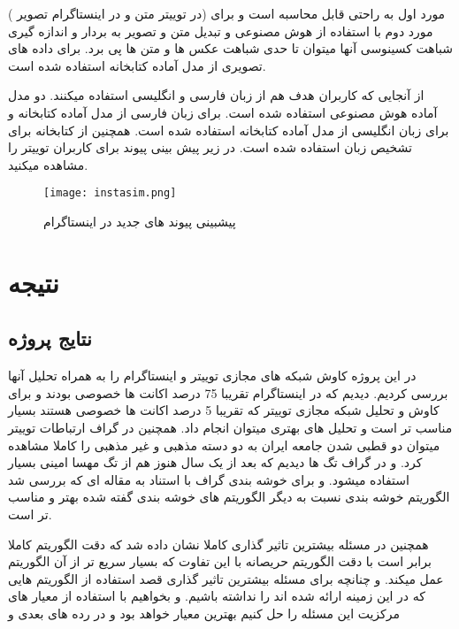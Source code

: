 \documentclass[12pt]{article}
\begin{document}
( در توييتر متن و در اينستاگرام تصوير)
مورد اول به راحتی قابل محاسبه است و برای مورد دوم با استفاده از هوش مصنوعی و تبديل متن و 
تصوير به بردار و اندازه گيری شباهت کسينوسی آنها ميتوان تا حدی شباهت عکس ها و متن ها پی برد.
برای داده های تصویری از مدل آماده کتابخانه 
استفاده شده است.
\cite{ibed}

از آنجایی که کاربران هدف هم از زبان فارسی و انگلیسی استفاده میکنند.
دو مدل آماده هوش مصنوعی استفاده شده است.
برای زبان فارسی از مدل آماده  کتابخانه 
\cite{hazm}
و برای زبان انگلیسی از مدل آماده کتابخانه 
\cite{sentvec}
استفاده شده است.
همچنین از کتابخانه
\cite{detect}
برای تشخیص زبان استفاده شده است.
در زير پيش بينی پيوند برای کاربران توييتر را مشاهده ميکنيد.
\begin{figure}[htbp]
\centering
\texttt{[image: instasim.png]}
\caption{پیشبینی پیوند های جدید در اینستاگرام}
\end{figure}

\newpage

\section{نتیجه}

\subsection{نتایج پروژه}
در این پروژه کاوش شبکه های مجازی توییتر و اینستاگرام را به همراه تحلیل آنها بررسی کردیم.
دیدیم که در اینستاگرام تقریبا 75 درصد اکانت ها خصوصی بودند و برای کاوش و تحلیل شبکه مجازی توییتر که تقریبا 5 درصد اکانت ها خصوصی هستند بسیار مناسب تر است و تحلیل های بهتری میتوان انجام داد.
همچنین در گراف ارتباطات توییتر میتوان دو قطبی شدن جامعه ایران به دو دسته مذهبی و غیر مذهبی را کاملا مشاهده کرد.
و در گراف تگ ها دیدیم که بعد از یک سال هنوز هم از تگ مهسا امینی بسیار استفاده میشود.
و برای خوشه بندی گراف با استناد به مقاله ای که بررسی شد الگوریتم خوشه بندی
نسبت به دیگر الگوریتم های خوشه بندی گفته شده بهتر و مناسب تر است.

همچنین در مسئله بیشترین تاثیر گذاری کاملا نشان داده شد که دقت الگوریتم
کاملا برابر است با دقت الگوریتم حریصانه با این تفاوت که بسیار سریع تر از آن الگوریتم عمل میکند.
و چنانچه برای مسئله بیشترین تاثیر گذاری قصد استفاده از الگوریتم هایی که در این زمینه ارائه شده اند را نداشته باشیم. و بخواهیم با استفاده از معیار های مرکزیت این مسئله را حل کنیم بهترین معیار 
خواهد بود و در رده های بعدی
و
\end{document}
